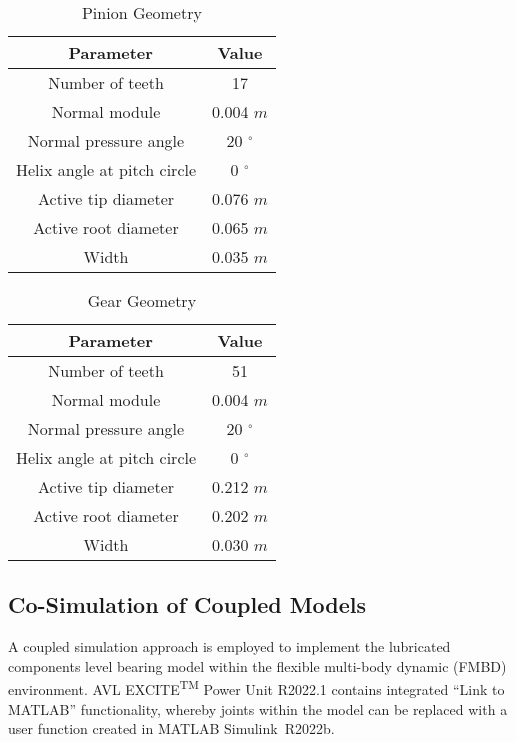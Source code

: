 \begin{table*}
	\caption{Pinion Geometry}
	\label{Pinion Geometry}
	\centering
	\renewcommand{\arraystretch}{1.5}%
	\begin{tabular}{|c|c|}
		\hline
		\ \textbf{Parameter} & \textbf{Value} \\ [0.5ex]
		\hline
		Number of teeth & 17 \\ [0.5ex]
		\hline
		Normal module & 0.004 $m$ \\ [0.5ex]
		\hline
		Normal pressure angle & 20 $^{\circ}$ \\ [0.5ex]
		\hline
		Helix angle at pitch circle & 0 $^{\circ}$ \\ [0.5ex]
		\hline
		Active tip diameter & 0.076 $m$ \\ [0.5ex]
		\hline
		Active root diameter & 0.065 $m$ \\ [0.5ex]
		\hline
		Width & 0.035 $m$ \\ [0.5ex]
		\hline
	\end{tabular}
\end{table*}

\begin{table*}
	\caption{Gear Geometry}
	\label{Gear Geometry}
	\centering
	\renewcommand{\arraystretch}{1.5}%
	\begin{tabular}{|c|c|}
		\hline
		\ \textbf{Parameter} & \textbf{Value} \\ [0.5ex]
		\hline
		Number of teeth & 51 \\ [0.5ex]
		\hline
		Normal module & 0.004 $m$ \\ [0.5ex]
		\hline
		Normal pressure angle & 20 $^{\circ}$ \\ [0.5ex]
		\hline
		Helix angle at pitch circle & 0 $^{\circ}$ \\ [0.5ex]
		\hline
		Active tip diameter & 0.212 $m$ \\ [0.5ex]
		\hline
		Active root diameter & 0.202 $m$ \\ [0.5ex]
		\hline
		Width & 0.030 $m$ \\ [0.5ex]
		\hline
	\end{tabular}
\end{table*}

\subsection{Co-Simulation of Coupled Models}
A coupled simulation approach is employed to implement the lubricated components level bearing model within the flexible multi-body dynamic (FMBD) environment. AVL EXCITE\textsuperscript{TM} Power Unit R2022.1 contains integrated “Link to MATLAB” functionality, whereby joints within the model can be replaced with a user function created in MATLAB Simulink\textregistered\ R2022b.

